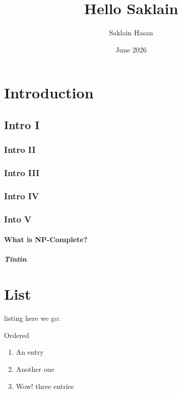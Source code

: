 \documentclass[10pt]{article} %
\title{Hello Saklain}
\author{Saklain Hasan}
\date{June 2026}
\begin{document}
\maketitle

\tableofcontents

\section{Introduction}

\lipsum[1-6]

\subsection{Intro I}
\lipsum[5-7]

\subsubsection{Intro II}
\lipsum[8]

\subsubsection{Intro III}
\lipsum[9]

\subsubsection*{Intro IV}          %
\lipsum[8]

\subsubsection{Into V}
\lipsum[9]

\paragraph{What is NP-Complete?} \lipsum[9]
\subparagraph{Tintin} \lipsum[4]

\section{List}

listing here we go:


Ordered
\begin{enumerate}
    \item An entry
    \item Another one
    \item Wow! three entries
\end{enumerate}
\end{document}

